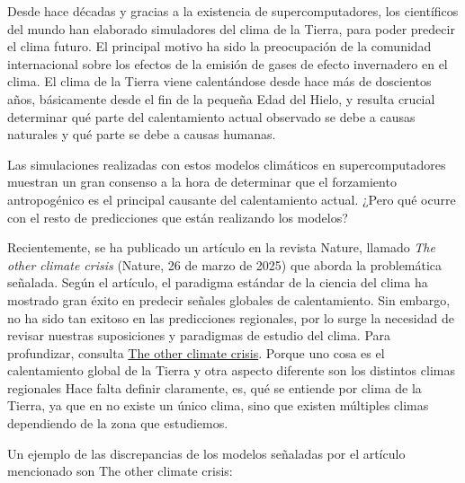 \documentclass[
  11pt,
  a4paper,
  DIV=11,
  numbers=noendperiod]{scrreprt}
\begin{document}
Desde hace décadas y gracias a la existencia de supercomputadores, los
científicos del mundo han elaborado simuladores del clima de la Tierra,
para poder predecir el clima futuro. El principal motivo ha sido la
preocupación de la comunidad internacional sobre los efectos de la
emisión de gases de efecto invernadero en el clima. El clima de la
Tierra viene calentándose desde hace más de doscientos años, básicamente
desde el fin de la pequeña Edad del Hielo, y resulta crucial determinar
qué parte del calentamiento actual observado se debe a causas naturales
y qué parte se debe a causas humanas.

Las simulaciones realizadas con estos modelos climáticos en
supercomputadores muestran un gran consenso a la hora de determinar que
el forzamiento antropogénico es el principal causante del calentamiento
actual. ¿Pero qué ocurre con el resto de predicciones que están
realizando los modelos?

Recientemente, se ha publicado un artículo en la revista Nature, llamado
\emph{The other climate crisis} (Nature, 26 de marzo de 2025) que aborda
la problemática señalada. Según el artículo, el paradigma estándar de la
ciencia del clima ha mostrado gran éxito en predecir señales globales de
calentamiento. Sin embargo, no ha sido tan exitoso en las predicciones
regionales, por lo surge la necesidad de revisar nuestras suposiciones y
paradigmas de estudio del clima. Para profundizar, consulta
\href{https://www.nature.com/articles/s41586-025-08680-1}{The other
climate crisis}. Porque uno cosa es el calentamiento global de la Tierra
y otra aspecto diferente son los distintos climas regionales Hace falta
definir claramente, es, qué se entiende por clima de la Tierra, ya que
en no existe un único clima, sino que existen múltiples climas
dependiendo de la zona que estudiemos.

Un ejemplo de las discrepancias de los modelos señaladas por el artículo
mencionado son The other climate crisis:
\end{document}
